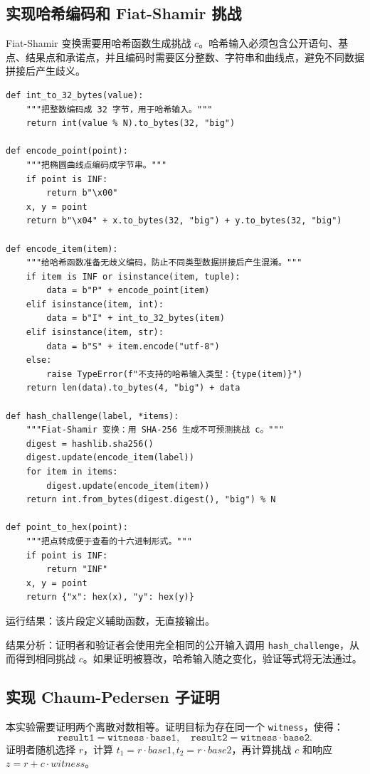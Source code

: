 \documentclass[a4paper]{article}
\begin{document}
	\subsection{实现哈希编码和 Fiat-Shamir 挑战}
	Fiat-Shamir 变换需要用哈希函数生成挑战 \(c\)。哈希输入必须包含公开语句、基点、结果点和承诺点，并且编码时需要区分整数、字符串和曲线点，避免不同数据拼接后产生歧义。
	
	\begin{lstlisting}[caption={哈希编码与 Fiat-Shamir 挑战}]
def int_to_32_bytes(value):
    """把整数编码成 32 字节，用于哈希输入。"""
    return int(value % N).to_bytes(32, "big")

def encode_point(point):
    """把椭圆曲线点编码成字节串。"""
    if point is INF:
        return b"\x00"
    x, y = point
    return b"\x04" + x.to_bytes(32, "big") + y.to_bytes(32, "big")

def encode_item(item):
    """给哈希函数准备无歧义编码，防止不同类型数据拼接后产生混淆。"""
    if item is INF or isinstance(item, tuple):
        data = b"P" + encode_point(item)
    elif isinstance(item, int):
        data = b"I" + int_to_32_bytes(item)
    elif isinstance(item, str):
        data = b"S" + item.encode("utf-8")
    else:
        raise TypeError(f"不支持的哈希输入类型：{type(item)}")
    return len(data).to_bytes(4, "big") + data

def hash_challenge(label, *items):
    """Fiat-Shamir 变换：用 SHA-256 生成不可预测挑战 c。"""
    digest = hashlib.sha256()
    digest.update(encode_item(label))
    for item in items:
        digest.update(encode_item(item))
    return int.from_bytes(digest.digest(), "big") % N

def point_to_hex(point):
    """把点转成便于查看的十六进制形式。"""
    if point is INF:
        return "INF"
    x, y = point
    return {"x": hex(x), "y": hex(y)}
	\end{lstlisting}
	
	运行结果：该片段定义辅助函数，无直接输出。
	
	结果分析：证明者和验证者会使用完全相同的公开输入调用 \texttt{hash\_challenge}，从而得到相同挑战 \(c\)。如果证明被篡改，哈希输入随之变化，验证等式将无法通过。
	
	\subsection{实现 Chaum-Pedersen 子证明}
	本实验需要证明两个离散对数相等。证明目标为存在同一个 \texttt{witness}，使得：
	\[
		\texttt{result1}=\texttt{witness}\cdot\texttt{base1},\quad
		\texttt{result2}=\texttt{witness}\cdot\texttt{base2}.
	\]
	证明者随机选择 \(r\)，计算 \(t_1=r\cdot base1,t_2=r\cdot base2\)，再计算挑战 \(c\) 和响应 \(z=r+c\cdot witness\)。
	
\end{document}
